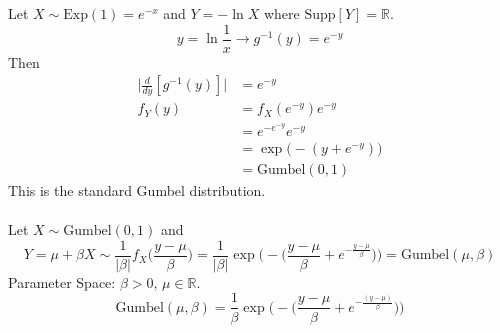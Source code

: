 \documentclass[12pt]{article}
\newcommand{\supp}[1]{\text{Supp}[ #1 ]}
\newcommand{\ginvy}{g^{-1}(y)}
\begin{document}
Let $X \sim \text{Exp}(1) = e^{-x}$ and $Y = -\ln X$ where $\supp{Y} = \mathbb{R}$. $$ y = \ln \frac{1}{x} \to \ginvy = e^{-y}$$ 
Then $$ \begin{aligned} \Big| \frac{d}{dy} [\ginvy] \Big| &= e^{-y} \\ f_Y(y) &= f_X(e^{-y})e^{-y} \\ &= e^{-e^{-y}}e^{-y} \\ &= \exp\Big(-(y + e^{-y})\Big) \\ &= \text{Gumbel}(0, 1) \end{aligned} $$ This is the standard Gumbel distribution. \\~\\
Let $X \sim \text{Gumbel}(0, 1)$ and $$Y = \mu + \beta X \sim \frac{1}{|\beta|} f_X\Big( \frac{y - \mu}{\beta}\Big) = \frac{1}{|\beta|} \exp\Big(-\Big( \frac{y - \mu}{\beta} + e^{-\frac{y - \mu}{\beta}}\Big)\Big) = \text{Gumbel}(\mu, \beta) $$ Parameter Space: $\beta > 0$, $\mu \in \mathbb{R}$. 
$$\text{Gumbel}(\mu, \beta) = \frac{1}{\beta} \exp\Big(-\Big( \frac{y - \mu}{\beta} + e^{- \frac{(y - \mu)}{\beta}}\Big)\Big) $$ 
\end{document}
